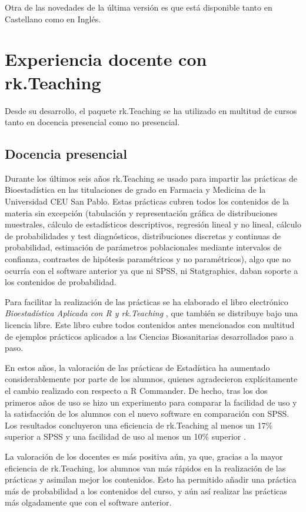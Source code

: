\documentclass[a4paper,10pt,twoside]{article}
\newcommand{\rkteaching}{\textsf{rk.Teaching}}
\newcommand{\spss}{\textsf{SPSS}}
\newcommand{\statgraphics}{\textsf{Statgraphics}}
\newcommand{\rcommander}{\textsf{R Commander}}
\begin{document}
Otra de las novedades de la última versión es que está disponible tanto en Castellano como en Inglés. 

\section{Experiencia docente con \rkteaching}
\label{s:docencia}
Desde su desarrollo, el paquete \rkteaching{} se ha utilizado en multitud de cursos tanto en docencia presencial como no
presencial. 

\subsection{Docencia presencial}
Durante los últimos seis años \rkteaching{} se usado para impartir las prácticas de Bioestadística en las titulaciones
de grado en Farmacia y Medicina de la Universidad CEU San Pablo.
Estas prácticas cubren todos los contenidos de la materia sin excepción (tabulación y representación gráfica de
distribuciones muestrales, cálculo de estadísticos descriptivos, regresión lineal y no lineal, cálculo de probabilidades
y test diagnósticos, distribuciones discretas y continuas de probabilidad, estimación de parámetros poblacionales
mediante intervalos de confianza, contrastes de hipótesis paramétricos y no paramétricos), algo que no ocurría con el
software anterior ya que ni \spss{}, ni \statgraphics{}, daban soporte a los contenidos de probabilidad.

Para facilitar la realización de las prácticas se ha elaborado el libro electrónico \emph{Bioestadística Aplicada
con R y rk.Teaching} \cite{sanchez2014bioestadistica}, que también se distribuye bajo una licencia libre. 
Este libro cubre todos contenidos antes mencionados con multitud de ejemplos prácticos aplicados a las Ciencias
Biosanitarias desarrollados paso a paso.

En estos años, la valoración de las prácticas de Estadística ha aumentado considerablemente por parte de los alumnos,
quienes agradecieron explícitamente el cambio realizado con respecto a \rcommander{}. 
De hecho, tras los dos primeros años de uso se hizo un experimento para comparar la facilidad de uso y la satisfacción
de los alumnos con el nuevo software en comparación con \spss{}.
Los resultados concluyeron una eficiencia de \rkteaching{} al menos un 17\% superior a \spss{} y una facilidad de uso al
menos un 10\% superior \cite{sanchez2011rkteaching}.

La valoración de los docentes es más positiva aún, ya que, gracias a la mayor eficiencia de \rkteaching{}, los
alumnos van más rápidos en la realización de las prácticas y asimilan mejor los contenidos. 
Esto ha permitido añadir una práctica más de probabilidad a los contenidos del curso, y aún así realizar las prácticas
más olgadamente que con el software anterior.
\end{document}
